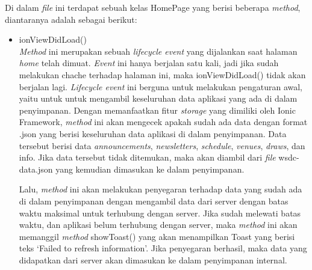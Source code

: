 \begin{enumerate}
	Di dalam \textit{file} ini terdapat sebuah kelas HomePage yang berisi beberapa \textit{method}, diantaranya adalah sebagai berikut:
	
	\begin{itemize}
		\item ionViewDidLoad() \\
		\textit{Method} ini merupakan sebuah \textit{lifecycle event} yang dijalankan saat halaman \textit{home} telah dimuat. \textit{Event} ini hanya berjalan satu kali, jadi jika sudah melakukan chache terhadap halaman ini, maka ionViewDidLoad() tidak akan berjalan lagi. \textit{Lifecycle event} ini berguna untuk melakukan pengaturan awal, yaitu untuk untuk mengambil keseluruhan data aplikasi yang ada di dalam penyimpanan. Dengan memanfaatkan fitur \textit{storage} yang dimiliki oleh Ionic Framework, \textit{method} ini akan mengecek apakah sudah ada data dengan format .json yang berisi keseluruhan data aplikasi di dalam penyimpanan. Data tersebut berisi data \textit{announcements}, \textit{newsletters}, \textit{schedule}, \textit{venues}, \textit{draws}, dan info. Jika data tersebut tidak ditemukan, maka akan diambil dari \textit{file} wsdc-data.json yang kemudian dimasukan ke dalam penyimpanan.

		Lalu, \textit{method} ini akan melakukan penyegaran terhadap data yang sudah ada di dalam penyimpanan dengan mengambil data dari server dengan batas waktu maksimal untuk terhubung dengan server. Jika sudah melewati batas waktu, dan aplikasi belum terhubung dengan server, maka \textit{method} ini akan memanggil \textit{method} showToast() yang akan menampilkan Toast yang berisi teks `Failed to refresh information'. Jika penyegaran berhasil, maka data yang didapatkan dari server akan dimasukan ke dalam penyimpanan internal.
	

\end{itemize}
\end{enumerate}
